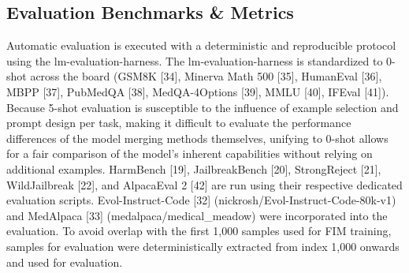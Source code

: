 \documentclass{article}
\begin{document}
\subsection{Evaluation Benchmarks \& Metrics}
\label{app:evaluation_benchmarks}

Automatic evaluation is executed with a deterministic and reproducible protocol using the lm-evaluation-harness. The lm-evaluation-harness is standardized to 0-shot across the board (GSM8K [34], Minerva Math 500 [35], HumanEval [36], MBPP [37], PubMedQA [38], MedQA-4Options [39], MMLU [40], IFEval [41]). Because 5-shot evaluation is susceptible to the influence of example selection and prompt design per task, making it difficult to evaluate the performance differences of the model merging methods themselves, unifying to 0-shot allows for a fair comparison of the model's inherent capabilities without relying on additional examples.
HarmBench [19], JailbreakBench [20], StrongReject [21], WildJailbreak [22], and AlpacaEval 2 [42] are run using their respective dedicated evaluation scripts.
Evol-Instruct-Code [32] (nickrosh/Evol-Instruct-Code-80k-v1) and MedAlpaca [33] (medalpaca/medical\_meadow) were incorporated into the evaluation.
To avoid overlap with the first 1,000 samples used for FIM training, samples for evaluation were deterministically extracted from index 1,000 onwards and used for evaluation.



\end{document}

